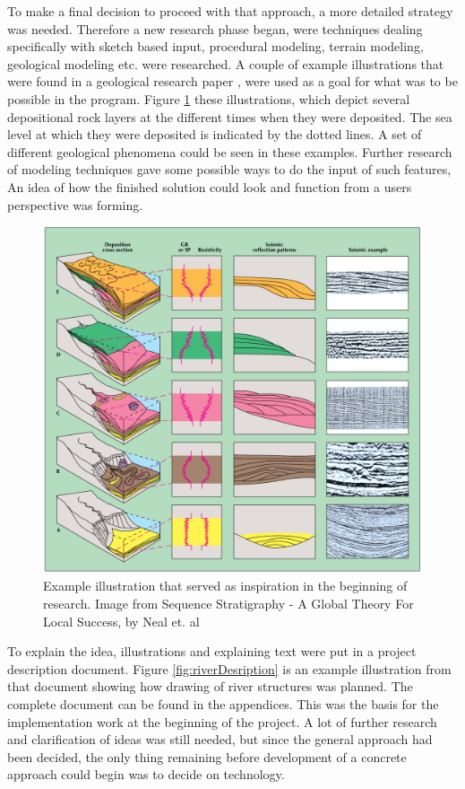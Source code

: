 \documentclass[a4paper,12pt]{report}
\begin{document}
To make a final decision to proceed with that approach, a more detailed strategy was needed. Therefore a new research phase began, were techniques dealing specifically with sketch based input, procedural modeling, terrain modeling, geological modeling etc. were researched. A couple of example illustrations that were found in a geological research paper \cite{neal1993sequence}, were used as a goal for what was to be possible in the program. Figure \ref{fig:inspiration1} these illustrations, which depict several depositional rock layers at the different times when they were deposited. The sea level at which they were deposited is indicated by the dotted lines. A set of different geological phenomena could be seen in these examples. Further research of modeling techniques gave some possible ways to do the input of such features, An idea of how the finished solution could look and function from a users perspective was forming.


\begin{figure}
 \includegraphics[width=\linewidth]{thesis/inspiration1.png}
 \caption{Example illustration that served as inspiration in the beginning of research. Image from Sequence Stratigraphy - A Global Theory For Local Success, by Neal et. al}
 \label{fig:inspiration1}
\end{figure}


To explain the idea, illustrations and explaining text were put in a project description document. Figure \ref{fig:riverDesription} is an example illustration from that document showing how drawing of river structures was planned. The complete document can be found in the appendices. This was the basis for the implementation work at the beginning of the project. A lot of further research and clarification of ideas was still needed, but since the general approach had been decided, the only thing remaining before development of a concrete approach could begin was to decide on technology.
\end{document}
